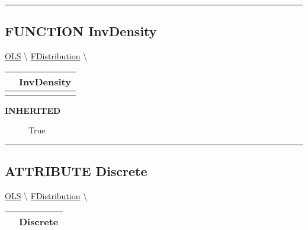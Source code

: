 \rule{\linewidth}{0.5pt}
\subsection*{\textsf{\colorbox{headtoc}{\color{white} FUNCTION}
InvDensity}}

\hypertarget{ecldoc:linearregression.ols.distributionbase.invdensity}{}
\hspace{0pt} \hyperlink{ecldoc:linearregression.ols}{OLS} \textbackslash 
\hspace{0pt} \hyperlink{ecldoc:linearregression.ols.fdistribution}{FDistribution} \textbackslash 

{\renewcommand{\arraystretch}{1.5}
\begin{tabularx}{\textwidth}{|>{\raggedright\arraybackslash}l|X|}
\hline
\hspace{0pt}\mytexttt{\color{red} } & \textbf{InvDensity} \\
\hline
\multicolumn{2}{|>{\raggedright\arraybackslash}X|}{\hspace{0pt}\mytexttt{\color{param} (t\_FieldReal delta)}} \\
\hline
\end{tabularx}
}

\par

\par
\begin{description}
\item [\colorbox{tagtype}{\color{white} \textbf{\textsf{INHERITED}}}] \textbf{\underline{}} True
\end{description}

\rule{\linewidth}{0.5pt}
\subsection*{\textsf{\colorbox{headtoc}{\color{white} ATTRIBUTE}
Discrete}}

\hypertarget{ecldoc:linearregression.ols.distributionbase.discrete}{}
\hspace{0pt} \hyperlink{ecldoc:linearregression.ols}{OLS} \textbackslash 
\hspace{0pt} \hyperlink{ecldoc:linearregression.ols.fdistribution}{FDistribution} \textbackslash 

{\renewcommand{\arraystretch}{1.5}
\begin{tabularx}{\textwidth}{|>{\raggedright\arraybackslash}l|X|}
\hline
\hspace{0pt}\mytexttt{\color{red} } & \textbf{Discrete} \\
\hline
\end{tabularx}
}


